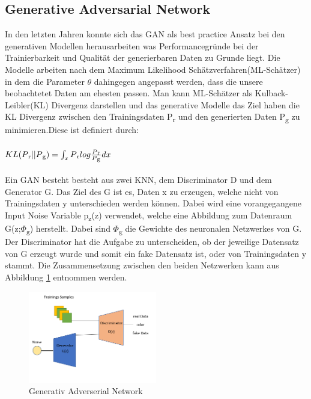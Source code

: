 \documentclass{llncs}
\begin{document}
\subsection{Generative Adversarial Network}
In den letzten Jahren konnte sich das GAN als best practice Ansatz bei den generativen Modellen herausarbeiten was Performancegründe bei der Trainierbarkeit und Qualität der generierbaren Daten zu Grunde liegt\cite{Grundlagen}. Die Modelle arbeiten nach dem Maximum Likelihood Schätzverfahren(ML-Schätzer) in dem die Parameter $\theta$ dahingegen angepasst werden, dass die unsere beobachtetet Daten am ehesten passen. Man kann ML-Schätzer als Kulback-Leibler(KL) Divergenz darstellen und das generative Modelle das Ziel haben die KL Divergenz zwischen den Trainingsdaten P\textsubscript{r} und den generierten Daten P\textsubscript{g} zu minimieren.Diese ist definiert durch:
\\\\
\begin{math}
KL(P\textsubscript{r}||P\textsubscript{g})=\int_x P\textsubscript{r}log\frac{P\textsubscript{r}}{P\textsubscript{g}}dx                     
\end{math}
\\\\
Ein GAN besteht besteht aus zwei KNN, dem Discriminator D und dem Generator G. Das Ziel des G ist es, Daten x zu erzeugen, welche nicht von Trainingsdaten y unterschieden werden können. Dabei wird eine vorangegangene Input Noise Variable p\textsubscript{z}(z) verwendet, welche eine Abbildung zum Datenraum G(z;$\Phi$\textsubscript{g}) herstellt. Dabei sind $\Phi$\textsubscript{g} die Gewichte des neuronalen Netzwerkes von G. Der Discriminator hat die Aufgabe zu unterscheiden, ob der jeweilige Datensatz von G erzeugt wurde und somit ein fake Datensatz ist, oder von Trainingsdaten y stammt\cite{goodfellow2014}. Die Zusammensetzung zwischen den beiden Netzwerken kann aus Abbildung \ref{fig:Bild20} entnommen werden.
\\
\begin{figure}[htbp] 
	\centering
	\includegraphics[width=0.5\textwidth]{GAN_GRUNDAUFBAU.png}
	\caption{Generativ Adverserial Network}
	\label{fig:Bild20}
\end{figure}
\end{document}

